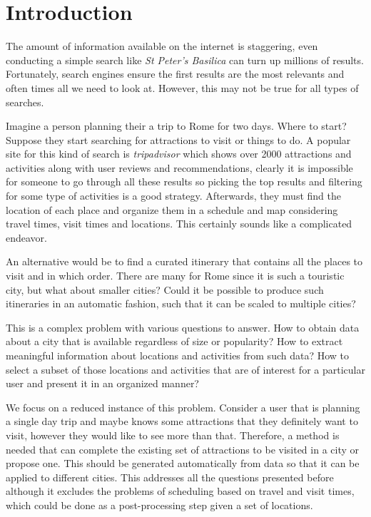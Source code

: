 \chapter{Introduction}
\label{sec:introduction}

The amount of information available on the internet is staggering, even conducting a simple search like \textit{St Peter's Basilica} can turn up millions of results. Fortunately, search engines ensure the first results are the most relevants and often times all we need to look at. However, this may not be true for all types of searches.

Imagine a person planning their a trip to Rome for two days. Where to start? Suppose they start searching for attractions to visit or things to do. A popular site for this kind of search is \textit{tripadvisor} which shows over 2000 attractions and activities along with user reviews and recommendations, clearly it is impossible for someone to go through all these results so picking the top results and filtering for some type of activities is a good strategy. Afterwards, they must find the location of each place and organize them in a schedule and map considering travel times, visit times and locations. This certainly sounds like a complicated endeavor.

An alternative would be to find a curated itinerary that contains all the places to visit and in which order. There are many for Rome since it is such a touristic city, but what about smaller cities? Could it be possible to produce such itineraries in an automatic fashion, such that it can be scaled to multiple cities?

This is a complex problem with various questions to answer. How to obtain data about a city that is available regardless of size or popularity? How to extract meaningful information about locations and activities from such data? How to select a subset of those locations and activities that are of interest for a particular user and present it in an organized manner?

We focus on a reduced instance of this problem. Consider a user that is planning a single day trip and maybe knows some attractions that they definitely want to visit, however they would like to see more than that. Therefore, a method is needed that can complete the existing set of attractions to be visited in a city or propose one. This should be generated automatically from data so that it can be applied to different cities. This addresses all the questions presented before although it excludes the problems of scheduling based on travel and visit times, which could be done as a post-processing step given a set of locations.

